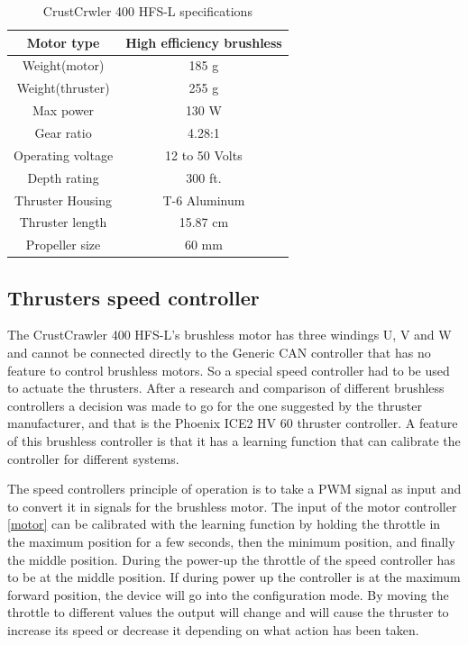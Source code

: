 \begin{table}[h]
\centering
    \caption{CrustCrwler 400 HFS-L specifications}
    \begin{tabular}{|c|c|} \hline
    \label{table:one_column}
       Motor type    &  High efficiency brushless \\ \hline
       Weight(motor) & 185 g \\ \hline
         Weight(thruster) & 255 g \\ \hline
           Max power &  130 W \\ \hline
             Gear ratio & 4.28:1 \\ \hline
               Operating voltage & 12 to 50 Volts \\ \hline
                 Depth rating  & 300 ft. \\ \hline
                   Thruster Housing & T-6 Aluminum \\ \hline
                     Thruster length & 15.87 cm \\ \hline  
                      Propeller size & 60 mm \\ \hline
     
    \end{tabular}
\end{table}
 
\subsection{Thrusters speed controller}
The CrustCrawler 400 HFS-L's brushless motor has three windings U, V and W and cannot be connected directly to the Generic CAN controller that has no feature to control brushless motors. So a special speed controller had to be used to actuate the thrusters. After a research and comparison of different brushless controllers a decision was made to go for the one suggested by the thruster manufacturer, and that is the Phoenix ICE2 HV 60 thruster controller. A feature of this brushless controller is that it has a learning function that can calibrate the controller for different systems. 

The speed controllers principle of operation is to take a PWM signal as input and to convert it in signals for the brushless motor. The input of the motor controller \ref{motor} can be calibrated with the learning function by holding the throttle in the maximum position  for a few seconds, then  the minimum position, and finally the middle position. During the power-up the throttle of the speed controller has to be at the middle position. If during power up  the controller is at the maximum forward position, the device will  go into the configuration mode. By moving the throttle to different values the output will change and will cause the thruster to increase its speed or decrease it depending on what action has been taken. 
